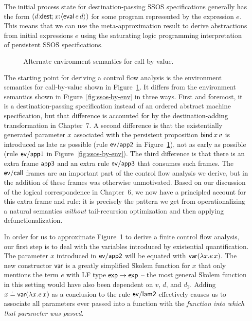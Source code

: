 The initial process state for destination-passing SSOS specifications
generally has the form $(d{:}{\sf dest}; x{:}\langle {{\sf eval}\,e\,d} \rangle)$
for some program represented by the expression $e$. This means that we
can use the meta-approximation result to derive abstractions from
initial expressions $e$ using the saturating logic programming
interpretation of persistent SSOS specifications.

\begin{figure}
\caption{Alternate environment semantics for call-by-value.}
\label{fig:dest-env}
\end{figure}

The starting point for deriving a control flow analysis is the
environment semantics for call-by-value shown in
Figure~\ref{fig:dest-env}. It differs from the environment semantics
shown in Figure~\ref{fig:ssos-by-env} in three ways. First and
foremost, it is a destination-passing specification instead of an
ordered abstract machine specification, but that difference is
accounted for by the destination-adding transformation in Chapter~7.
A second difference is that the existentially generated parameter $x$
associated with the persistent proposition ${\sf bind}\,x\,v$ is
introduced as late as possible (rule ${\sf ev/app2}$ in
Figure~\ref{fig:dest-env}), not as early as possible (rule ${\sf
  ev/app1}$ in Figure~\ref{fig:ssos-by-env}). The third difference is
that there is an extra frame ${\sf app3}$ and an extra rule ${\sf
  ev/app3}$ that consumes such frames. The ${\sf ev/call}$ frames are
an important part of the control flow analysis we derive, but in
\cite{simmons11logical} the addition of these frames was otherwise
unmotivated. Based on our discussion of the logical correspondence in
Chapter~6, we now have a principled account for this extra frame and
rule: it is precisely the pattern we get from operationalizing a
natural semantics {\it without} tail-recursion optimization and then
applying defunctionalization.

In order for us to approximate Figure~\ref{fig:dest-env} to derive a
finite control flow analysis, our first step is to deal with the
variables introduced by existential quantification. The parameter $x$
introduced in ${\sf ev/app2}$ will be equated with ${\sf var}(\lambda
x.e\,x)$. The new constructor ${\sf var}$ is a greatly simplified
Skolem function for $x$ that only mentions the term $e$ with LF type
${\sf exp} \rightarrow {\sf exp}$ -- the most general Skolem function
in this setting would have also been dependent on $v$, $d$, and
$d_2$. Adding $x \doteq {\sf var}(\lambda x.e\,x)$ as a conclusion to
the rule ${\sf ev/lam2}$ effectively causes us to associate all
parameters ever passed into a function with the {\it function into
  which that parameter was passed}.

